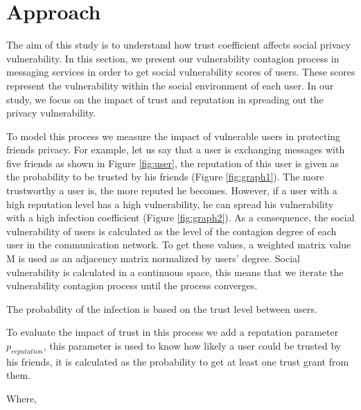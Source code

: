 \section{Approach} \label{sec:Approach}

The aim of this study is to understand how trust coefficient affects social privacy vulnerability.
In this section,
	we present our vulnerability contagion process in messaging services in order to get social vulnerability scores of users.
These scores represent the vulnerability within the social environment of each user.
In our study,
	we focus on the impact of trust and reputation in spreading out the privacy vulnerability.

To model this process we measure the impact of vulnerable users in protecting friends privacy.
For example,
	let us say that a user is exchanging messages with five friends as shown in Figure \ref{fig:user},
	the reputation of this user is given as the probability to be trusted by his friends (Figure \ref{fig:graph1}).
The more trustworthy a user is,
	the more reputed he becomes.
However,
	if a user with a high reputation level has a high vulnerability,
	he can spread his vulnerability with a high infection coefficient (Figure \ref{fig:graph2}).
As a consequence,
	the social vulnerability of users is calculated as the level of the contagion degree of each user in the communication network.
To get these values,
	a weighted matrix value M is used as an adjacency matrix normalized by users' degree.
Social vulnerability is calculated in a continuous space,
	this means that we iterate the vulnerability contagion process until the process converges.%

The probability of the infection is based on the trust level between users.


To evaluate the impact of trust in this process we add a reputation parameter $p_{reputation}$,
	this parameter is used to know how likely a user could be trusted by his friends,
	it is calculated as the probability to get at least one trust grant from them.


Where,

